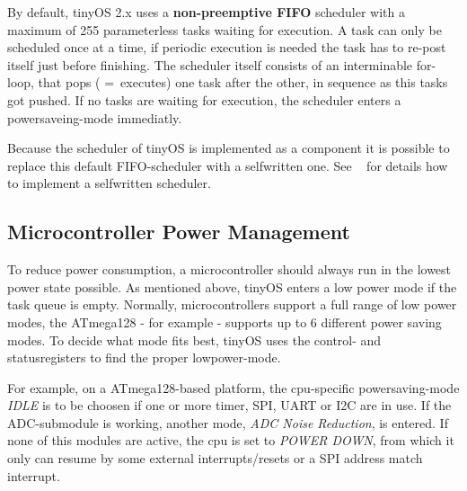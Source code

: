 By default, tinyOS 2.x uses a \textbf{non-preemptive FIFO} scheduler with a maximum of 255 parameterless tasks waiting for execution. A task can only be scheduled once at a time, if periodic execution is needed the task has to re-post itself just before finishing. The scheduler itself consists of an interminable for-loop, that pops ( = executes) one task after the other, in sequence as this tasks got pushed. If no tasks are waiting for execution, the scheduler enters a powersaveing-mode immediatly.

Because the scheduler of tinyOS is implemented as a component it is possible to replace this default FIFO-scheduler with a selfwritten one. See ~\cite{tep106:2003} for details how to implement a selfwritten scheduler.

\subsection{Microcontroller Power Management}

To reduce power consumption, a microcontroller should always run in the lowest power state possible. As mentioned above, tinyOS enters a low power mode if the task queue is empty. Normally, microcontrollers support a full range of low power modes, the ATmega128 - for example - supports up to 6 different power saving modes.
To decide what mode fits best, tinyOS uses the control- and statusregisters to find the proper lowpower-mode.

For example, on a ATmega128-based platform, the cpu-specific powersaving-mode \textit{IDLE} is to be choosen if one or more timer, SPI, UART or I2C are in use. If the ADC-submodule is working, another mode, \textit{ADC Noise Reduction}, is entered. If none of this modules are active, the cpu is set to \textit{POWER DOWN}, from which it only can resume by some external interrupts/resets or a SPI address match interrupt.


